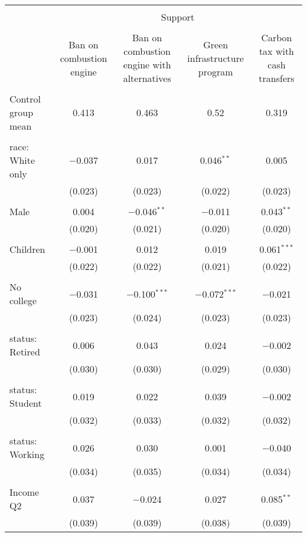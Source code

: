 
\begin{tabular}{@{\extracolsep{5pt}}lcccc} 
\\[-1.8ex]\hline 
\hline \\[-1.8ex] 
 & \multicolumn{4}{c}{Support} \\ 
\cline{2-5} 
\\[-1.8ex] & Ban on combustion engine & Ban on combustion engine with alternatives & Green infrastructure program & Carbon tax with cash transfers \\ 
\hline \\[-1.8ex] 
 Control group mean & 0.413 & 0.463 & 0.52 & 0.319  \\ \hline \\[-1.8ex] race: White only & $-$0.037 & 0.017 & 0.046$^{**}$ & 0.005 \\ 
  & (0.023) & (0.023) & (0.022) & (0.023) \\ 
  & & & & \\ 
 Male & 0.004 & $-$0.046$^{**}$ & $-$0.011 & 0.043$^{**}$ \\ 
  & (0.020) & (0.021) & (0.020) & (0.020) \\ 
  & & & & \\ 
 Children & $-$0.001 & 0.012 & 0.019 & 0.061$^{***}$ \\ 
  & (0.022) & (0.022) & (0.021) & (0.022) \\ 
  & & & & \\ 
 No college & $-$0.031 & $-$0.100$^{***}$ & $-$0.072$^{***}$ & $-$0.021 \\ 
  & (0.023) & (0.024) & (0.023) & (0.023) \\ 
  & & & & \\ 
 status: Retired & 0.006 & 0.043 & 0.024 & $-$0.002 \\ 
  & (0.030) & (0.030) & (0.029) & (0.030) \\ 
  & & & & \\ 
 status: Student & 0.019 & 0.022 & 0.039 & $-$0.002 \\ 
  & (0.032) & (0.033) & (0.032) & (0.032) \\ 
  & & & & \\ 
 status: Working & 0.026 & 0.030 & 0.001 & $-$0.040 \\ 
  & (0.034) & (0.035) & (0.034) & (0.034) \\ 
  & & & & \\ 
 Income Q2 & 0.037 & $-$0.024 & 0.027 & 0.085$^{**}$ \\ 
  & (0.039) & (0.039) & (0.038) & (0.039) \\ 

\end{tabular}

